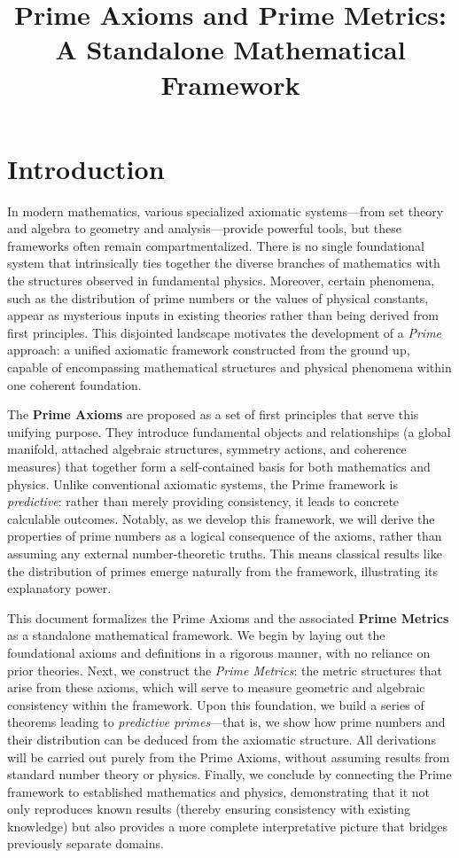 \documentclass[11pt]{article}
\begin{document}
\title{Prime Axioms and Prime Metrics:\\ A Standalone Mathematical Framework}
\author{}
\date{}
\maketitle

\section{Introduction}
In modern mathematics, various specialized axiomatic systems---from set theory and algebra to geometry and analysis---provide powerful tools, but these frameworks often remain compartmentalized. There is no single foundational system that intrinsically ties together the diverse branches of mathematics with the structures observed in fundamental physics. Moreover, certain phenomena, such as the distribution of prime numbers or the values of physical constants, appear as mysterious inputs in existing theories rather than being derived from first principles. This disjointed landscape motivates the development of a \emph{Prime} approach: a unified axiomatic framework constructed from the ground up, capable of encompassing mathematical structures and physical phenomena within one coherent foundation.

The \textbf{Prime Axioms} are proposed as a set of first principles that serve this unifying purpose. They introduce fundamental objects and relationships (a global manifold, attached algebraic structures, symmetry actions, and coherence measures) that together form a self-contained basis for both mathematics and physics. Unlike conventional axiomatic systems, the Prime framework is \emph{predictive}: rather than merely providing consistency, it leads to concrete calculable outcomes. Notably, as we develop this framework, we will derive the properties of prime numbers as a logical consequence of the axioms, rather than assuming any external number-theoretic truths. This means classical results like the distribution of primes emerge naturally from the framework, illustrating its explanatory power.

This document formalizes the Prime Axioms and the associated \textbf{Prime Metrics} as a standalone mathematical framework. We begin by laying out the foundational axioms and definitions in a rigorous manner, with no reliance on prior theories. Next, we construct the \emph{Prime Metrics}: the metric structures that arise from these axioms, which will serve to measure geometric and algebraic consistency within the framework. Upon this foundation, we build a series of theorems leading to \emph{predictive primes}---that is, we show how prime numbers and their distribution can be deduced from the axiomatic structure. All derivations will be carried out purely from the Prime Axioms, without assuming results from standard number theory or physics. Finally, we conclude by connecting the Prime framework to established mathematics and physics, demonstrating that it not only reproduces known results (thereby ensuring consistency with existing knowledge) but also provides a more complete interpretative picture that bridges previously separate domains.
\end{document}
